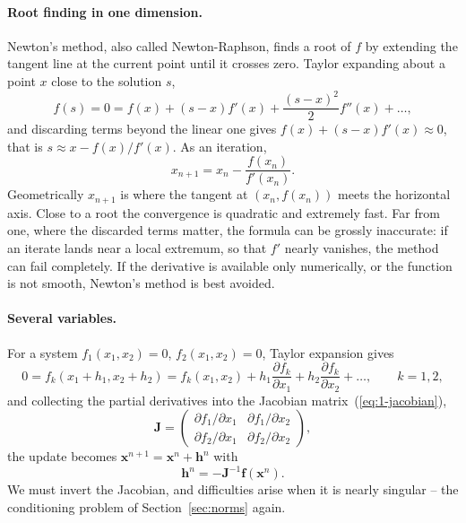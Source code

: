 \paragraph{Root finding in one dimension.}
Newton's method, also called Newton-Raphson, finds a root of $f$ by extending
the tangent line at the current point until it crosses zero.  Taylor expanding
about a point $x$ close to the solution $s$,
\begin{equation}
  f(s) = 0 = f(x) + (s-x)f'(x) + \frac{(s-x)^{2}}{2}f''(x)+\dots,
  \label{eq:4-taylornr}
\end{equation}
and discarding terms beyond the linear one gives $f(x)+(s-x)f'(x)\approx0$,
that is $s\approx x-f(x)/f'(x)$.  As an iteration,
\begin{equation}
  x_{n+1} = x_n - \frac{f(x_n)}{f'(x_n)} .
  \label{eq:4-newton1d}
\end{equation}
Geometrically $x_{n+1}$ is where the tangent at $(x_n,f(x_n))$ meets the
horizontal axis.  Close to a root the convergence is quadratic and extremely
fast.  Far from one, where the discarded terms matter, the formula can be
grossly inaccurate: if an iterate lands near a local extremum, so that
$f'$ nearly vanishes, the method can fail completely.  If the derivative is
available only numerically, or the function is not smooth, Newton's method is
best avoided.

\paragraph{Several variables.}
For a system $f_1(x_1,x_2)=0$, $f_2(x_1,x_2)=0$, Taylor expansion gives
\begin{equation}
  0 = f_k(x_1+h_1,x_2+h_2)
    = f_k(x_1,x_2) + h_1\frac{\partial f_k}{\partial x_1}
                   + h_2\frac{\partial f_k}{\partial x_2} + \dots,
  \qquad k=1,2,
  \label{eq:4-newtonmulti}
\end{equation}
and collecting the partial derivatives into the Jacobian
matrix~(\ref{eq:1-jacobian}),
\begin{equation}
  \bm{J} = \begin{pmatrix}
    \partial f_1/\partial x_1 & \partial f_1/\partial x_2\\
    \partial f_2/\partial x_1 & \partial f_2/\partial x_2
  \end{pmatrix},
  \label{eq:4-jacobian2}
\end{equation}
the update becomes $\bm{x}^{n+1}=\bm{x}^{n}+\bm{h}^{n}$ with
\begin{equation}
  \bm{h}^{n} = -\bm{J}^{-1}\bm{f}(\bm{x}^{n}).
  \label{eq:4-newtonstep}
\end{equation}
We must invert the Jacobian, and difficulties arise when it is nearly
singular -- the conditioning problem of Section~\ref{sec:norms} again.

